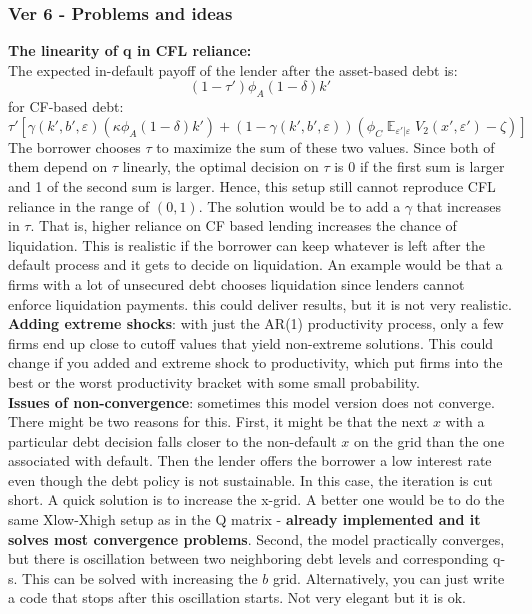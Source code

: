 \documentclass[12pt]{article}
\DeclareMathOperator{\E}{\mathbb{E}}
\begin{document}
\subsubsection*{Ver 6 - Problems and ideas}
\textbf{The linearity of q in CFL reliance:} \\
The expected in-default payoff of the lender after the asset-based debt is: 
$$  (1-\tau') \phi_A (1-\delta) k'  $$
for CF-based debt: 
$$    \tau'\left[\gamma(k',b',\varepsilon)(\kappa \phi_A  (1-\delta) k') +  (1-\gamma(k',b',\varepsilon))\left( \phi_C \E_{\varepsilon'|\varepsilon}V_2 (x', \varepsilon') - \zeta \right) \right] $$
The borrower chooses $\tau$ to maximize the sum of these two values. Since both of them depend on $\tau$ linearly, the optimal decision on $\tau$ is 0 if the first sum is larger and 1 of the second sum is larger. Hence, this setup still cannot reproduce CFL reliance in the range of $(0,1)$. The solution would be to add a $\gamma$ that increases in $\tau$. That is, higher reliance on CF based lending increases the chance of liquidation. This is realistic if the borrower can keep whatever is left after the default process and it gets to decide on liquidation. An example would be that a firms with a lot of unsecured debt chooses liquidation since lenders cannot enforce liquidation payments. this could deliver results, but it is not very realistic. \vspace{3mm} \\
\textbf{Adding extreme shocks}: with just the AR(1) productivity process, only a few firms end up close to cutoff values that yield non-extreme solutions. This could change if you added and extreme shock to productivity, which put firms into the best or the worst productivity bracket with some small probability.  \vspace{3mm} \\ 
\textbf{Issues of non-convergence}: sometimes this model version does not converge. There might be two reasons for this. First, it might be that the next $x$ with a particular debt decision falls closer to the non-default $x$ on the grid than the one associated with default. Then the lender offers the borrower a low interest rate even though the debt policy is not sustainable. In this case, the iteration is cut short. A quick solution is to increase the x-grid. A better one would be to do the same Xlow-Xhigh setup as in the Q matrix - \textbf{already implemented and it solves most convergence problems}. Second, the model practically converges, but there is oscillation between two neighboring debt levels and corresponding q-s. This can be solved with increasing the $b$ grid. Alternatively, you can just write a code that stops after this oscillation starts. Not very elegant but it is ok.
\end{document}

